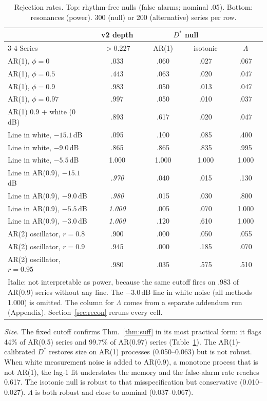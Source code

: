 \documentclass[10pt,twocolumn,letterpaper]{article}
\theoremstyle{definition}
\theoremstyle{remark}
\begin{document}
\begin{table}[t]
\centering\footnotesize
\caption{Rejection rates. Top: rhythm-free nulls (false alarms; nominal .05).
Bottom: resonances (power). 300 (null) or 200 (alternative) series per row.}
\label{tab:res}
\setlength{\tabcolsep}{3.4pt}
\begin{tabular}{@{}lcccc@{}}
\toprule
 & v2 depth & \multicolumn{2}{c}{$D^*$ null} & \\
\cmidrule(lr){3-4}
Series & $>0.227$ & AR(1) & isotonic & $\Lambda$\\
\midrule
AR(1), $\phi=0$ & .033 & .060 & .027 & .067\\
AR(1), $\phi=0.5$ & .443 & .063 & .020 & .047\\
AR(1), $\phi=0.9$ & .983 & .050 & .013 & .047\\
AR(1), $\phi=0.97$ & .997 & .050 & .010 & .037\\
AR(1) 0.9 + white (0\,dB) & .893 & .617 & .020 & .047\\
\midrule
Line in white, $-15.1$\,dB & .095 & .100 & .085 & .400\\
Line in white, $-9.0$\,dB & .865 & .865 & .835 & .995\\
Line in white, $-5.5$\,dB & 1.000 & 1.000 & 1.000 & 1.000\\
Line in AR(0.9), $-15.1$\,dB & \textit{.970} & .040 & .015 & .130\\
Line in AR(0.9), $-9.0$\,dB & \textit{.980} & .015 & .030 & .800\\
Line in AR(0.9), $-5.5$\,dB & \textit{1.000} & .005 & .070 & 1.000\\
Line in AR(0.9), $-3.0$\,dB & \textit{1.000} & .120 & .610 & 1.000\\
AR(2) oscillator, $r=0.8$ & .900 & .000 & .050 & .055\\
AR(2) oscillator, $r=0.9$ & .945 & .000 & .185 & .070\\
AR(2) oscillator, $r=0.95$ & .980 & .035 & .575 & .510\\
\bottomrule
\multicolumn{5}{p{0.95\columnwidth}}{\scriptsize Italic: not interpretable as
power, because the same cutoff fires on .983 of AR(0.9) series without any line.
The $-3.0$\,dB line in white noise (all methods 1.000) is omitted. The column
for $\Lambda$ comes from a separate addendum run (Appendix).
Section~\ref{sec:recon} reruns every cell.}
\end{tabular}
\end{table}

\textit{Size.} The fixed cutoff confirms Thm.~\ref{thm:suff} in its most
practical form: it flags 44\% of AR(0.5) series and 99.7\% of AR(0.97) series
(Table~\ref{tab:res}). The AR(1)-calibrated $D^*$ restores size on AR(1)
processes (0.050--0.063) but is not robust. When white measurement noise is
added to AR(0.9), a monotone process that is not AR(1), the lag-1 fit
understates the memory and the false-alarm rate reaches 0.617. The isotonic null
is robust to that misspecification but conservative (0.010--0.027). $\Lambda$ is
both robust and close to nominal (0.037--0.067).
\end{document}
